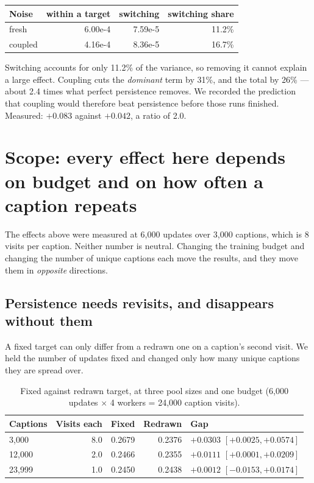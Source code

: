 \documentclass[11pt]{article}
\newcommand{\obs}[1]{\textcolor{obsblue}{#1}}
\newcommand{\bad}[1]{\textcolor{badred}{#1}}
\begin{document}
\begin{center}
\small
\begin{tabular}{@{}lrrr@{}}
\toprule
Noise & within a target & switching & switching share \\
\midrule
fresh & \obs{6.00e-4} & \obs{7.59e-5} & \obs{11.2\%} \\
coupled & \obs{4.16e-4} & \obs{8.36e-5} & \obs{16.7\%} \\
\bottomrule
\end{tabular}
\end{center}

Switching accounts for only \obs{11.2\%} of the variance, so removing it cannot explain a large
effect. Coupling cuts the \emph{dominant} term by \obs{31\%}, and the total by \obs{26\%} --- about
\obs{2.4} times what perfect persistence removes. We recorded the prediction that coupling would
therefore beat persistence before those runs finished. Measured: \obs{$+0.083$} against
\obs{$+0.042$}, a ratio of \obs{2.0}.


\section{Scope: every effect here depends on budget and on how often a caption repeats}
\label{sec:scope}

The effects above were measured at \obs{6{,}000} updates over \obs{3{,}000} captions, which is
\obs{8} visits per caption. Neither number is neutral. Changing the training budget and changing the
number of unique captions each move the results, and they move them in \emph{opposite} directions.

\subsection{Persistence needs revisits, and disappears without them}

A fixed target can only differ from a redrawn one on a caption's second visit. We held the number of
updates fixed and changed only how many unique captions they are spread over.

\begin{table}[h]
\centering
\caption{Fixed against redrawn target, at three pool sizes and one budget
(\obs{6{,}000} updates $\times$ \obs{4} workers = \obs{24{,}000} caption visits).}
\label{tab:captioncount}
\small
\begin{tabular}{@{}lrrrl@{}}
\toprule
Captions & Visits each & Fixed & Redrawn & Gap \\
\midrule
\obs{3{,}000}  & \obs{8.0} & \obs{0.2679} & \obs{0.2376} & \obs{$+0.0303$} $[+0.0025,+0.0574]$ \\
\obs{12{,}000} & \obs{2.0} & \obs{0.2466} & \obs{0.2355} & \obs{$+0.0111$} $[+0.0001,+0.0209]$ \\
\obs{23{,}999} & \obs{1.0} & \obs{0.2450} & \obs{0.2438} & \bad{$+0.0012$} $[-0.0153,+0.0174]$ \\
\bottomrule
\end{tabular}
\end{table}
\end{document}
